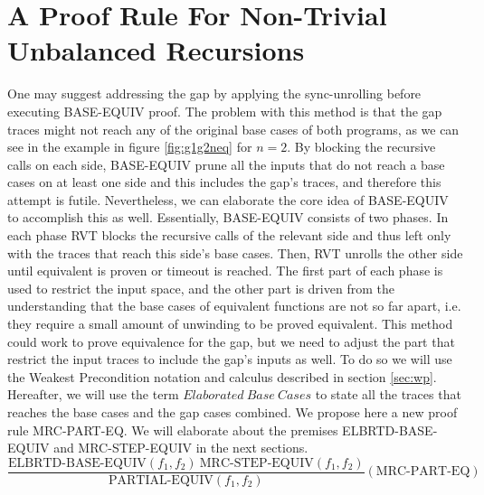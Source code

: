 \section{A Proof Rule For Non-Trivial Unbalanced Recursions}
One may suggest addressing the gap by applying the sync-unrolling before executing BASE-EQUIV proof. The problem with this method is that the gap traces might not reach any of the original base cases of both programs, as we can see in the example in figure \ref{fig:g1g2neq} for $n=2$. By blocking the recursive calls on each side, BASE-EQUIV prune all the inputs that do not reach a base cases on at least one side and this includes the gap's traces, and therefore this attempt is futile.
Nevertheless, we can elaborate the core idea of BASE-EQUIV to accomplish this as well. Essentially, BASE-EQUIV consists of two phases. In each phase RVT blocks the recursive calls of the relevant side and thus left only with the traces that reach this side's base cases. Then, RVT unrolls the other side until equivalent is proven or timeout is reached. The first part of each phase is used to restrict the input space, and the other part is driven from the understanding that the base cases of equivalent functions are not so far apart, i.e. they require a small amount of unwinding to be proved equivalent. This method could work to prove equivalence for the gap, but we need to adjust the part that restrict the input traces to include the gap's inputs as well.
To do so we will use the Weakest Precondition notation and calculus \cite{10.1145/360933.360975} described in section \ref{sec:wp}. Hereafter, we will use the term $Elaborated\ Base\ Cases$ to state all the traces that reaches the base cases and the gap cases combined.
We propose here a new proof rule MRC-PART-EQ. We will elaborate about the premises ELBRTD-BASE-EQUIV and MRC-STEP-EQUIV in the next sections.
\begin{equation}
 {\frac {\text{ELBRTD-BASE-EQUIV}(f_1,f_2) \:\text{MRC-STEP-EQUIV}(f_1,f_2)}{\text{PARTIAL-EQUIV}(f_1,f_2)}} 
  (\text{MRC-PART-EQ})
\end{equation}

